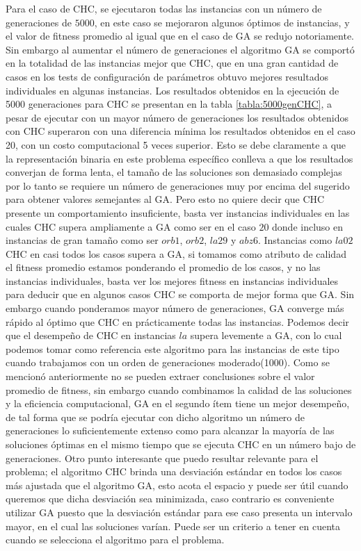 \documentclass[journal]{IEEEtran}
\begin{document}
Para el caso de CHC, se ejecutaron todas las instancias con un número de generaciones de $5000$, en este caso se mejoraron algunos óptimos de instancias, y el valor de fitness promedio al igual que en el caso de GA se redujo notoriamente. Sin embargo al aumentar el número de generaciones el algoritmo GA se comportó en la totalidad de las instancias mejor que CHC, que en una gran cantidad de casos en los tests de configuración de parámetros obtuvo mejores resultados individuales en algunas instancias.
Los resultados obtenidos en la ejecución de 5000 generaciones para CHC se presentan en la tabla \ref{tabla:5000genCHC}, a pesar de ejecutar con un mayor número de generaciones los resultados obtenidos con CHC superaron con una diferencia mínima los resultados obtenidos en el caso 20, con un costo computacional 5 veces superior. Esto se debe claramente a que la representación binaria en este problema específico conlleva a que los resultados converjan de forma lenta, el tamaño de las soluciones son demasiado complejas por lo tanto se requiere un número de generaciones muy por encima del sugerido para obtener valores semejantes al GA.
Pero esto no quiere decir que CHC presente un comportamiento insuficiente, basta ver instancias individuales en las cuales CHC supera ampliamente a GA como ser en el caso $20$ donde incluso en instancias de gran tamaño como ser $orb1$, $orb2$, $la29$ y $abz6$. Instancias como $la02$ CHC en casi todos los casos supera a GA, si tomamos como atributo de calidad el fitness promedio estamos ponderando el promedio de los casos, y no las instancias individuales, basta ver los mejores fitness en instancias individuales para deducir que en algunos casos CHC se comporta de mejor forma que GA. Sin embargo cuando ponderamos mayor número de generaciones, GA converge más rápido al óptimo que CHC en prácticamente todas las instancias.
Podemos decir que el desempeño de CHC en instancias $la$ supera levemente a GA, con lo cual podemos tomar como referencia este algoritmo para las instancias de este tipo cuando trabajamos con un orden de generaciones moderado(1000).
Como se mencionó anteriormente no se pueden extraer conclusiones sobre el valor promedio de fitness, sin embargo cuando combinamos la calidad de las soluciones y la eficiencia computacional, GA en el segundo ítem tiene un mejor desempeño, de tal forma que se podría ejecutar con dicho algoritmo un número de generaciones lo suficientemente extenso como para alcanzar la mayoría de las soluciones óptimas en el mismo tiempo que se ejecuta CHC en un número bajo de generaciones.
Otro punto interesante que puedo resultar relevante para el problema; el algoritmo CHC brinda una desviación estándar en todos los casos más ajustada que el algoritmo GA, esto acota el espacio y puede ser útil cuando queremos que dicha desviación sea minimizada, caso contrario es conveniente utilizar GA puesto que la desviación estándar para ese caso presenta un intervalo mayor, en el cual las soluciones varían. Puede ser un criterio a tener en cuenta cuando se selecciona el algoritmo para el problema.
\end{document}
